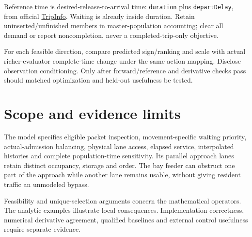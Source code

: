 \documentclass[10pt,a4paper]{article}
\begin{document}
Reference time is desired-release-to-arrival time:
\texttt{duration} plus \texttt{departDelay}, from official
\href{https://sumo.dlr.de/docs/Simulation/Output/TripInfo.html}{TripInfo}.
Waiting is already inside duration. Retain uninserted/unfinished members
in master-population accounting; clear all demand or report noncompletion,
never a completed-trip-only objective.

For each feasible direction, compare predicted sign/ranking and scale
with actual richer-evaluator complete-time change under the same action
mapping. Disclose observation conditioning. Only after forward/reference
and derivative checks pass should matched optimization and held-out
usefulness be tested.

\section{Scope and evidence limits}

The model specifies eligible packet inspection, movement-specific waiting
priority, actual-admission balancing, physical lane access, elapsed
service, interpolated histories and complete population-time sensitivity.
Its parallel approach lanes retain distinct occupancy, storage and order.
The bay feeder can obstruct one part of the approach while another lane
remains usable, without giving resident traffic an unmodeled bypass.

Feasibility and unique-selection arguments concern the mathematical
operators. The analytic examples illustrate local consequences.
Implementation correctness, numerical derivative agreement, qualified
baselines and external control usefulness require separate evidence.
\end{document}
